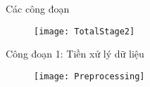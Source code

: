 \begin{frame}{Các công đoạn}
	\begin{figure}[h]
		\centering
		\texttt{[image: TotalStage2]}
	\end{figure}
\end{frame}


\begin{frame}{Công đoạn 1: Tiền xử lý dữ liệu}
	\begin{figure}
		\centering
		\texttt{[image: Preprocessing]}
	\end{figure}
	
\end{frame}

